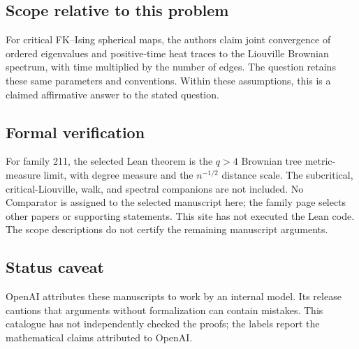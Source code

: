 \documentclass[11pt]{article}
\begin{document}
\subsection{Scope relative to this problem}
For critical FK--Ising spherical maps, the authors claim joint convergence of ordered eigenvalues and positive-time heat traces to the Liouville Brownian spectrum, with time multiplied by the number of edges. The question retains these same parameters and conventions. Within these assumptions, this is a claimed affirmative answer to the stated question.

\subsection{Formal verification}
For family 211, the selected Lean theorem is the $q>4$ Brownian tree metric-measure limit, with degree measure and the $n^{-1/2}$ distance scale. The subcritical, critical-Liouville, walk, and spectral companions are not included. No Comparator is assigned to the selected manuscript here; the family page selects other papers or supporting statements. This site has not executed the Lean code. The scope descriptions do not certify the remaining manuscript arguments.

\subsection{Status caveat}
OpenAI attributes these manuscripts to work by an internal model. Its release cautions that arguments without formalization can contain mistakes. This catalogue has not independently checked the proofs; the labels report the mathematical claims attributed to OpenAI.
\end{document}
